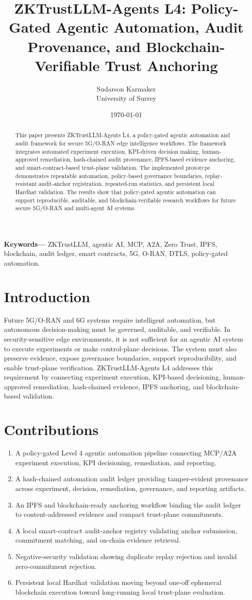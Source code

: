 \documentclass[10pt]{article}
\title{ZKTrustLLM-Agents L4: Policy-Gated Agentic Automation, Audit Provenance, and Blockchain-Verifiable Trust Anchoring}
\author{Sudarson Karmaker \\ University of Surrey}
\date{\today}
\begin{document}
\maketitle
\begin{abstract}
This paper presents ZKTrustLLM-Agents L4, a policy-gated agentic automation and audit framework for secure 5G/O-RAN edge intelligence workflows. The framework integrates automated experiment execution, KPI-driven decision making, human-approved remediation, hash-chained audit provenance, IPFS-based evidence anchoring, and smart-contract-based trust-plane validation. The implemented prototype demonstrates repeatable automation, policy-based governance boundaries, replay-resistant audit-anchor registration, repeated-run statistics, and persistent local Hardhat validation. The results show that policy-gated agentic automation can support reproducible, auditable, and blockchain-verifiable research workflows for future secure 5G/O-RAN and multi-agent AI systems.
\end{abstract}
\textbf{Keywords---} ZKTrustLLM, agentic AI, MCP, A2A, Zero Trust, IPFS, blockchain, audit ledger, smart contracts, 5G, O-RAN, DTLS, policy-gated automation.
\section{Introduction}
Future 5G/O-RAN and 6G systems require intelligent automation, but autonomous decision-making must be governed, auditable, and verifiable. In security-sensitive edge environments, it is not sufficient for an agentic AI system to execute experiments or make control-plane decisions. The system must also preserve evidence, expose governance boundaries, support reproducibility, and enable trust-plane verification. ZKTrustLLM-Agents L4 addresses this requirement by connecting experiment execution, KPI-based decisioning, human-approved remediation, hash-chained evidence, IPFS anchoring, and blockchain-based validation.
\section{Contributions}
\begin{enumerate}
\item A policy-gated Level 4 agentic automation pipeline connecting MCP/A2A experiment execution, KPI decisioning, remediation, and reporting.
\item A hash-chained automation audit ledger providing tamper-evident provenance across experiment, decision, remediation, governance, and reporting artifacts.
\item An IPFS and blockchain-ready anchoring workflow binding the audit ledger to content-addressed evidence and compact trust-plane commitments.
\item A local smart-contract audit-anchor registry validating anchor submission, commitment matching, and on-chain evidence retrieval.
\item Negative-security validation showing duplicate replay rejection and invalid zero-commitment rejection.
\item Persistent local Hardhat validation moving beyond one-off ephemeral blockchain execution toward long-running local trust-plane evaluation.
\end{enumerate}
\end{document}
